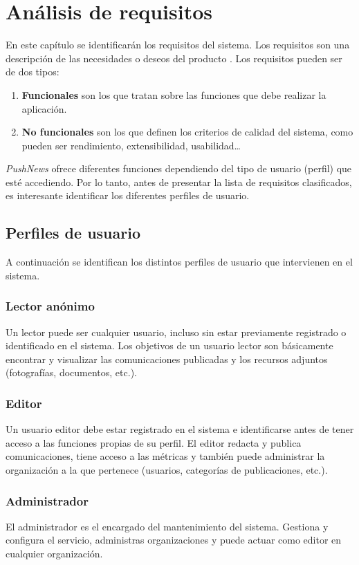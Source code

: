 \chapter{Análisis de requisitos}
En este capítulo se identificarán los requisitos del sistema. Los requisitos son una descripción de las necesidades o deseos del producto \cite{Larman2004}. Los requisitos pueden ser de dos tipos:
\begin{enumerate}
    \item \textbf{Funcionales} son los que tratan sobre las funciones que debe realizar la aplicación.
    \item \textbf{No funcionales} son los que definen los criterios de calidad del sistema, como pueden ser rendimiento, extensibilidad, usabilidad\dots
\end{enumerate}

\emph{PushNews} ofrece diferentes funciones dependiendo del tipo de usuario (perfil) que esté accediendo. Por lo tanto, antes de presentar la lista de requisitos clasificados, es interesante identificar los diferentes perfiles de usuario.

\section {Perfiles de usuario}
A continuación se identifican los distintos perfiles de usuario que intervienen en el sistema.

\subsection{Lector anónimo}
Un lector puede ser cualquier usuario, incluso sin estar previamente registrado o identificado en el sistema. Los objetivos de un usuario lector son básicamente encontrar y visualizar las comunicaciones publicadas y los recursos adjuntos (fotografías, documentos, etc.).

\subsection{Editor}
Un usuario editor debe estar registrado en el sistema e identificarse antes de tener acceso a las funciones propias de su perfil. El editor redacta y publica comunicaciones, tiene acceso a las métricas y también puede administrar la organización a la que pertenece (usuarios, categorías de publicaciones, etc.).

\subsection{Administrador}
El administrador es el encargado del mantenimiento del sistema. Gestiona y configura el servicio, administras organizaciones y puede actuar como editor en cualquier organización. 

